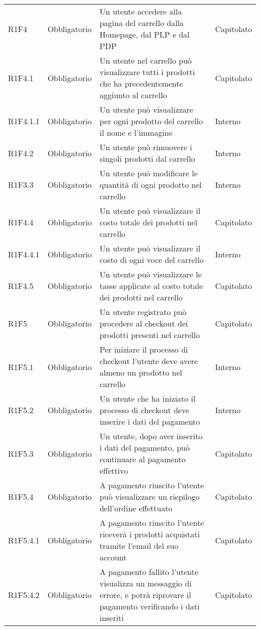 {\begin{longtable}{C{2.5cm} C{2.8cm} C{6.7cm} C{2.5cm}}
R1F4 & Obbligatorio & Un utente accedere alla pagina del carrello dalla Homepage, dal PLP e dal PDP & Capitolato \\
R1F4.1 & Obbligatorio & Un utente nel carrello può visualizzare tutti i prodotti che ha precedentemente aggiunto al carrello & Capitolato \\
R1F4.1.1 & Obbligatorio & Un utente può visualizzare per ogni prodotto del carrello il nome e l'immagine & Interno \\
R1F4.2 & Obbligatorio & Un utente può rimuovere i singoli prodotti dal carrello & Interno \\
R1F3.3 & Obbligatorio & Un utente può modificare le quantità di ogni prodotto nel carrello & Interno \\
R1F4.4 & Obbligatorio & Un utente può visualizzare il costo totale dei prodotti nel carrello & Capitolato \\
R1F4.4.1 & Obbligatorio & Un utente può visualizzare il costo di ogni voce del carrello & Interno \\
R1F4.5 & Obbligatorio & Un utente può visualizzare le tasse applicate al costo totale dei prodotti nel carrello & Capitolato \\


R1F5 & Obbligatorio & Un utente registrato può procedere al checkout dei prodotti presenti nel carrello & Capitolato \\
R1F5.1 & Obbligatorio & Per iniziare il processo di checkout l’utente deve avere almeno un prodotto nel carrello & Interno \\
R1F5.2 & Obbligatorio & Un utente che ha iniziato il processo di checkout deve inserire i dati del pagamento & Interno \\
R1F5.3 & Obbligatorio & Un utente, dopo aver inserito i dati del pagamento, può continuare al pagamento effettivo & Capitolato \\
R1F5.4 & Obbligatorio & A pagamento riuscito l’utente può visualizzare un riepilogo dell’ordine effettuato & Capitolato \\
R1F5.4.1 & Obbligatorio & A pagamento riuscito l’utente riceverà i prodotti acquistati tramite l’email del suo account & Capitolato \\
R1F5.4.2 & Obbligatorio & A pagamento fallito l’utente visualizza un messaggio di errore, e potrà riprovare il pagamento verificando i dati inseriti & Capitolato \\



\end{longtable}}
